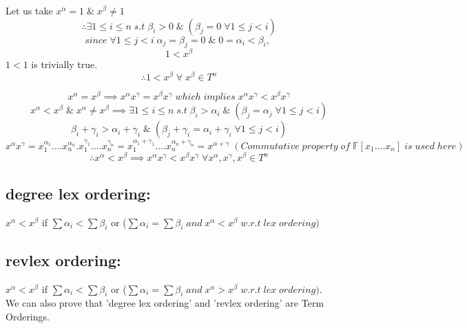 Let us take $x^{\alpha}=1\;\&\;x^{\beta}\neq1$
$$\therefore\exists 1\leq i\leq n\;s.t\;\beta_{i}>0 \;\&\;(\beta_{j}=0 \;\forall 1\leq j<i)$$
$$since\;\forall 1\leq j<i \;\alpha_{j}=\beta_{j}=0\;\&\;0=\alpha_{i}<\beta_{i},\;$$
$$1<x^{\beta}$$
$1<1$ is trivially true.
$$\therefore1<x^{\beta}\;\forall\;x^{\beta}\in T^{n}$$

$$x^{\alpha}=x^{\beta} \implies x^{\alpha}x^{\gamma}=x^{\beta}x^{\gamma}\;which\;implies\;x^{\alpha}x^{\gamma}<x^{\beta}x^{\gamma}$$
$$x^{\alpha}<x^{\beta} \;\&\;x^{\alpha}\neq x^{\beta}\implies \exists 1\leq i\leq n\;s.t\;\beta_{i}>\alpha_{i} \;\&\;(\beta_{j}=\alpha_{j} \;\forall 1\leq j<i)$$ 
$$\beta_{i}+\gamma_{i}>\alpha_{i}+\gamma_{i} \;\&\;(\beta_{j}+\gamma_{i}=\alpha_{i}+\gamma_{i} \;\forall 1\leq j<i)$$
$$x^{\alpha}x^{\gamma}=x_{1}^{\alpha_{1}}....x_{n}^{\alpha_{n}}.x_{1}^{\gamma_{1}}....x_{n}^{\gamma_{n}}=x_{1}^{\alpha_{1}+\gamma_{1}}....x_{n}^{\alpha_{n}+\gamma_{n}}=x^{\alpha+\gamma}\;(Commutative \;property \;of \;\mathbb{F}[x_{1}....x_{n}] \;is \;used \;here) $$
$$\therefore x^{\alpha}<x^{\beta}\implies x^{\alpha}x^{\gamma}<x^{\beta}x^{\gamma}\; \forall x^{\alpha},x^{\gamma},x^{\beta}\in T^{n}$$
\subsection*{degree lex ordering:}
$x^{\alpha}<x^{\beta}$ if $\sum\alpha_{i}<\sum\beta_{i}$ or ($\sum\alpha_{i}=\sum\beta_{i}\; and\; x^{\alpha}<x^{\beta}\; w.r.t \;lex\; ordering)$
\subsection*{revlex ordering:}
$x^{\alpha}<x^{\beta}$ if $\sum\alpha_{i}<\sum\beta_{i}$ or ($\sum\alpha_{i}=\sum\beta_{i}\; and\; x^{\alpha}>x^{\beta}\; w.r.t\; lex \;ordering)$.
$$$$
We can also prove that 'degree lex ordering' and 'revlex ordering' are Term Orderings.


